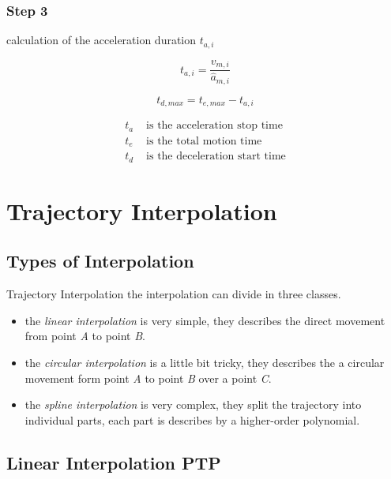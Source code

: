 \documentclass[%
  professionalfonts,%
  xcolor={%
    usenames,%
    dvipsnames,%
    svgnames,%
    table,%
    hyperref%
  }%
]{beamer}
\begin{document}
\subsubsection{Step 3}
\begin{frame}
calculation of the acceleration duration $t_{a,i}$

\begin{equation*}
t_{a,i} = \frac{v_{m,i}}{\hat{a}_{m,i}}
\end{equation*}

\begin{equation}
t_{d,max} = t_{e,max}-t_{a,i}
\end{equation}      

\begin{align*}
t_{a} & \text{ is the acceleration stop time} \\
t_{e} & \text{ is the total motion time} \\
t_{d} & \text{ is the deceleration start time}
\end{align*}
\end{frame}

\section{Trajectory Interpolation}
\subsection{Types of Interpolation}
\begin{frame}{Trajectory Interpolation}
the interpolation can divide in three classes.
\begin{itemize}
\item the \emph{linear interpolation} is very simple, they describes the direct movement from point \emph{A} to point \emph{B}.
\item the \emph{circular interpolation} is a little bit tricky, they describes the a circular movement form point \emph{A} to point \emph{B} over a point \emph{C}.
\item the \emph{spline interpolation} is very complex, they split the trajectory into individual parts, each part is describes by a higher-order polynomial.
\end{itemize}
\end{frame}

\subsection{Linear Interpolation PTP}
%
\end{document}
